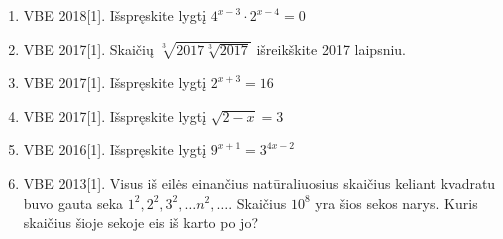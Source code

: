 \documentclass[a4paper]{article}
\begin{document}
\begin{enumerate}
\item VBE 2018[1]. Išspręskite lygtį $4^{x-3}\cdot 2^{x-4}=0$
\item VBE 2017[1]. Skaičių $\sqrt[3]{2017\sqrt[3]{2017}}$ išreikškite 2017 laipsniu.
\item VBE 2017[1]. Išspręskite lygtį $2^{x+3}=16$
\item VBE 2017[1]. Išspręskite lygtį $\sqrt{2-x}=3$
\item VBE 2016[1]. Išspręskite lygtį $9^{x+1}=3^{4x-2}$
\item VBE 2013[1]. Visus iš eilės einančius natūraliuosius skaičius keliant kvadratu buvo gauta seka $1^2, 2^2, 3^2, \dots n^2, \dots$. Skaičius $10^8$ yra šios sekos narys. Kuris skaičius šioje sekoje eis iš karto po jo?
\end{enumerate}
\end{document}
